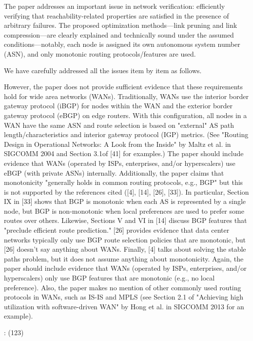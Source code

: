 \reviewer%
\label{rev:2}

\begin{generalcomment}
	The paper addresses an important issue in network verification: 
	efficiently verifying that reachability-related properties are satisfied in the presence of arbitrary failures. 
	The proposed optimization methods—link pruning and link compression—are clearly explained and technically sound under the assumed conditions—notably, 
	each node is assigned its own autonomous system number (ASN), 
	and only monotonic routing protocols/features are used.
\end{generalcomment}
\begin{revresponse}
	We have carefully addressed all the issues item by item as follows.
\end{revresponse}

\begin{revcomment}[label={comment:work-not-good}]
However, the paper does not provide sufficient evidence that these requirements hold for wide area networks (WANs). 
Traditionally, 
WANs use the interior border gateway protocol (iBGP) for nodes within the WAN and the exterior border gateway protocol (eBGP) on edge routers. 
With this configuration, 
all nodes in a WAN have the same ASN and route selection is based on "external" AS path length/characteristics and interior gateway protocol (IGP) metrics. 
(See "Routing Design in Operational Networks: A Look from the Inside" by Maltz et al. in SIGCOMM 2004 and Section 3.1of [41] for examples.) 
The paper should include evidence that WANs (operated by ISPs, enterprises, and/or hyperscalers) use eBGP (with private ASNs) internally. 
Additionally, the paper claims that monotonicity "generally holds in common routing protocols, e.g., BGP" but this is not supported by the references cited ([4], [14], [26], [33]). 
In particular, Section IX in [33] shows that BGP is monotonic when each AS is represented by a single node, 
but BGP is non-monotonic when local preferences are used to prefer some routes over others. 
Likewise, Sections V and VI in [14] discuss BGP features that "preclude efficient route prediction." 
[26] provides evidence that data center networks typically only use BGP route selection policies that are monotonic, 
but [26] doesn't say anything about WANs.  Finally, [4] talks about solving the stable paths problem, 
but it does not assume anything about monotonicity. 
Again, the paper should include evidence that WANs (operated by ISPs, enterprises, and/or hyperscalers) only use BGP features that are monotonic (e.g., no local preference). 
Also, the paper makes no mention of other commonly used routing protocols in WANs, such as IS-IS and MPLS (see Section 2.1 of "Achieving high utilization with software-driven WAN" by Hong et al. in SIGCOMM 2013 for an example).
\end{revcomment}
\begin{revresponse}
: (123)
\end{revresponse}

